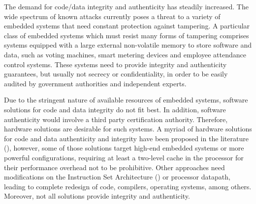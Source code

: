 
The demand for code/data integrity and authenticity has steadily increased. The wide spectrum of known attacks currently poses a threat to a variety of embedded systems that need constant protection against tampering. A particular class of embedded systems which must resist many forms of tampering comprises systems equipped with a large external non-volatile memory to store software and data, such as voting machines, smart metering devices and employee attendance control systems. These systems need to provide integrity and authenticity guarantees, but usually not secrecy or confidentiality, in order to be easily audited by government authorities and independent experts.

Due to the stringent nature of available resources of embedded systems, software solutions for code and data integrity do not fit best. In addition, software authenticity would involve a third party certification authority. Therefore, hardware solutions are desirable for such systems. A myriad of hardware solutions for code and data authenticity and integrity have been proposed in the literature (\cite{Suh2005:AEGISImplementation,Vaslin2009:OTP,Hong2010:FEDTIC,Bobade2015:SecurityFPGA}), however, some of those solutions target high-end embedded systems or more powerful configurations, requiring at least a two-level cache in the processor for their performance overhead not to be prohibitive. Other approaches need modifications on the Instruction Set Architecture (\isa) or processor datapath, leading to complete redesign of code, compilers, operating systems, among others. Moreover, not all solutions provide integrity and authenticity.

